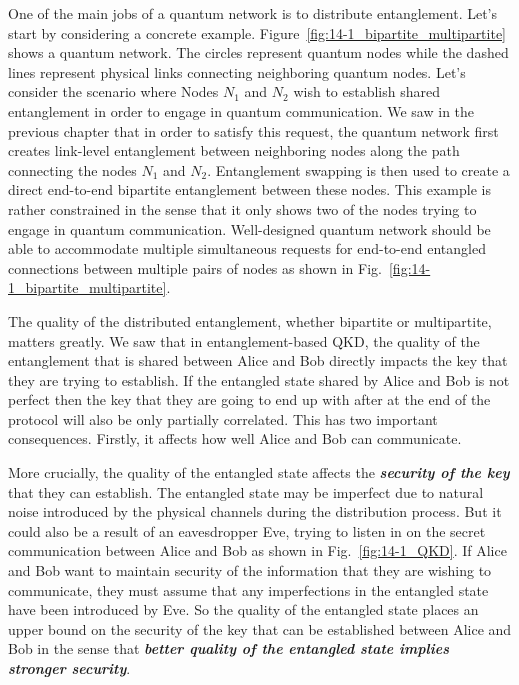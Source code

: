 One of the main jobs of a quantum network is to distribute entanglement.
Let's start by considering a concrete example.
Figure~\ref{fig:14-1_bipartite_multipartite} shows a quantum network.
The circles represent quantum nodes while the dashed lines represent physical links connecting neighboring quantum nodes.
Let's consider the scenario where Nodes $N_1$ and $N_2$ wish to establish shared entanglement in order to engage in quantum communication.
We saw in the previous chapter that in order to satisfy this request, the quantum network first creates link-level entanglement between neighboring nodes along the path connecting the nodes $N_1$ and $N_2$.
Entanglement swapping is then used to create a direct end-to-end bipartite entanglement between these nodes.
This example is rather constrained in the sense that it only shows two of the nodes trying to engage in quantum communication.
Well-designed quantum network should be able to accommodate multiple simultaneous requests for end-to-end entangled connections between multiple pairs of nodes as shown in Fig.~\ref{fig:14-1_bipartite_multipartite}. 

The quality of the distributed entanglement, whether bipartite or multipartite, matters greatly.
We saw that in entanglement-based QKD, the quality of the entanglement that is shared between Alice and Bob directly impacts the key that they are trying to establish.
If the entangled state shared by Alice and Bob is not perfect then the key that they are going to end up with after at the end of the protocol will also be only partially correlated.
This has two important consequences.
Firstly, it affects how well Alice and Bob can communicate.

More crucially, the quality of the entangled state affects the \textit{\textbf{security of the key}} that they can establish.
The entangled state may be imperfect due to natural noise introduced by the physical channels during the distribution process.
But it could also be a result of an eavesdropper Eve, trying to listen in on the secret communication between Alice and Bob as shown in Fig.~\ref{fig:14-1_QKD}.
If Alice and Bob want to maintain security of the information that they are wishing to communicate, they must assume that any imperfections in the entangled state have been introduced by Eve.
So the quality of the entangled state places an upper bound on the security of the key that can be established between Alice and Bob in the sense that \textit{\textbf{better quality of the entangled state implies stronger security}}.

